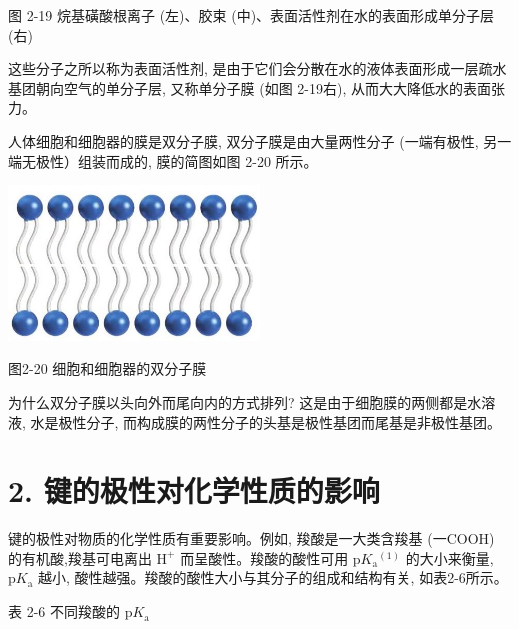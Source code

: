 \documentclass[10pt]{article}
\begin{document}
图 2-19 烷基磺酸根离子 (左)、胶束 (中)、表面活性剂在水的表面形成单分子层 (右)

这些分子之所以称为表面活性剂, 是由于它们会分散在水的液体表面形成一层疏水基团朝向空气的单分子层, 又称单分子膜 (如图 2-19右), 从而大大降低水的表面张力。

人体细胞和细胞器的膜是双分子膜, 双分子膜是由大量两性分子 (一端有极性, 另一端无极性）组装而成的, 膜的简图如图 2-20 所示。

\begin{center}
\includegraphics[max width=0.5\textwidth]{images/0190e026-5a11-7df7-bd27-54d09026ba7a_57_615722.jpg}
\end{center}

图2-20 细胞和细胞器的双分子膜

为什么双分子膜以头向外而尾向内的方式排列? 这是由于细胞膜的两侧都是水溶液, 水是极性分子, 而构成膜的两性分子的头基是极性基团而尾基是非极性基团。

\section*{2. 键的极性对化学性质的影响}

键的极性对物质的化学性质有重要影响。例如, 羧酸是一大类含羧基 (一COOH) 的有机酸,羧基可电离出 \({\mathrm{H}}^{ + }\) 而呈酸性。羧酸的酸性可用 \(\mathrm{p}{K}_{\mathrm{a}}{}^{\left( 1\right) }\) 的大小来衡量, \(\mathrm{p}{K}_{\mathrm{a}}\) 越小, 酸性越强。羧酸的酸性大小与其分子的组成和结构有关, 如表2-6所示。

表 2-6 不同羧酸的 \(\mathrm{p}{K}_{\mathrm{a}}\)

\begin{center}
\end{center}
\end{document}
